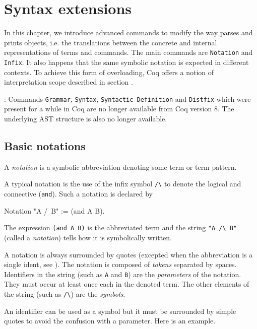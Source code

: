 \chapter{Syntax extensions}
\label{Addoc-syntax}

In this chapter, we introduce advanced commands to modify the way
{\Coq} parses and prints objects, i.e. the translations between the
concrete and internal representations of terms and commands. The main
commands are {\tt Notation} and {\tt Infix}.
It also happens that the same symbolic notation is expected in
different contexts. To achieve this form of overloading, Coq offers a
notion of interpretation scope described in section \label{scopes}.

\Rem: Commands {\tt Grammar}, {\tt Syntax}, {\tt Syntactic Definition}
and {\tt Distfix} which were present for a while in Coq are no longer
available from Coq version 8. The underlying AST structure is also no
longer available.

\section{Basic notations}
\label{Notation}

A {\em notation} is a symbolic abbreviation denoting some term
or term pattern.

A typical notation is the use of the infix symbol \verb=/\= to denote
the logical and connective (\texttt{and}). Such a notation is declared
by

\begin{coq_example*}
Notation "A /\ B" := (and A B).
\end{coq_example*}

The expression \texttt{(and A B)} is the abbreviated term and the
string \verb="A /\ B"= (called a {\em notation}) tells how it is 
symbolically written.

A notation is always surrounded by quotes (excepted when the
abbreviation is a single ident, see \label{Abbreviations}). The
notation is composed of {\em tokens} separated by spaces.  Identifiers
in the string (such as \texttt{A} and \texttt{B}) are the {\em
parameters} of the notation. They must occur at least once each in the
denoted term. The other elements of the string (such as \verb=/\=) are
the {\em symbols}.

An identifier can be used as a symbol but it must be surrounded by
simple quotes to avoid the confusion with a parameter. Here is an example.

